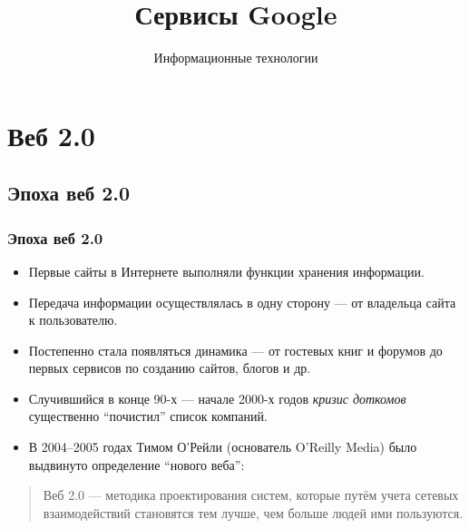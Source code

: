 \documentclass[compress,red]{beamer}
\title{Сервисы Google}
\author{Информационные технологии}
\begin{document}
\maketitle

\section{Веб 2.0}
\subsection{Эпоха веб 2.0}
\begin{frame}
\frametitle{Эпоха веб 2.0}
		\begin{itemize}
		\item Первые сайты в Интернете выполняли функции хранения информации.
		\item Передача информации осуществлялась в одну сторону --- от владельца сайта к пользователю.
		\item Постепенно стала появляться динамика --- от гостевых книг и форумов до первых сервисов по созданию сайтов, блогов и др.
		\item Случившийся в конце 90-х --- начале 2000-х годов \emph{кризис доткомов} существенно ``почистил'' список компаний.
		\item В 2004--2005 годах Тимом О'Рейли (основатель O'Reilly Media) было выдвинуто определение ``нового веба'': 
		\end{itemize}
		\begin{quote}
		   Веб 2.0 --- методика проектирования систем, которые путём учета сетевых взаимодействий становятся тем лучше, чем больше людей ими пользуются.
		\end{quote}
\end{frame}
\end{document}
